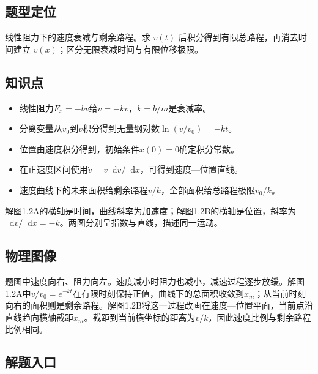 \documentclass[UTF8,fontset=fandol,a4paper,11pt]{ctexart}
\newcommand{\dd}{\mathop{}\!\mathrm{d}}
\begin{document}


\subsection*{题型定位}

线性阻力下的速度衰减与剩余路程。求 $v(t)$ 后积分得到有限总路程，再消去时间建立 $v(x)$；区分无限衰减时间与有限位移极限。



\subsection*{知识点}

\begin{itemize}
\item 线性阻力$F_x=-bv$给$\dot v=-kv$，$k=b/m$是衰减率。
\item 分离变量从$v_0$到$v$积分得到无量纲对数$\ln(v/v_0)=-kt$。
\item 位置由速度积分得到，初始条件$x(0)=0$确定积分常数。
\item 在正速度区间使用$\dot v=v\dd v/\dd x$，可得到速度—位置直线。
\item 速度曲线下的未来面积给剩余路程$v/k$，全部面积给总路程极限$v_0/k$。
\end{itemize}
解图1.2A的横轴是时间，曲线斜率为加速度；解图1.2B的横轴是位置，斜率为$\dd v/\dd x=-k$。两图分别呈指数与直线，描述同一运动。




\subsection*{物理图像}

题图中速度向右、阻力向左。速度减小时阻力也减小，减速过程逐步放缓。解图1.2A中$v/v_0=e^{-kt}$在有限时刻保持正值，曲线下的总面积收敛到$x_m$；从当前时刻向右的面积则是剩余路程。解图1.2B将这一过程改画在速度—位置平面，当前点沿直线趋向横轴截距$x_m$。截距到当前横坐标的距离为$v/k$，因此速度比例与剩余路程比例相同。



\subsection*{解题入口}
\end{document}
